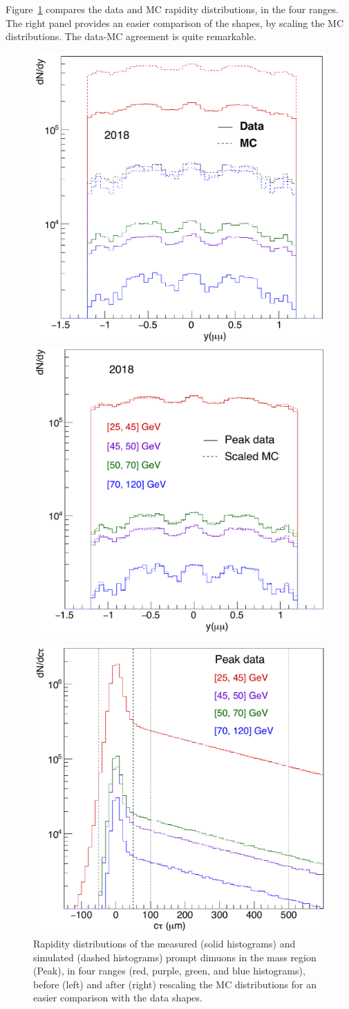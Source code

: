 \vfill\newpage

Figure~\ref{fig:Jpsi_y} compares the data and MC rapidity distributions,
in the four \pt ranges. The right panel provides an easier comparison of the shapes,
by scaling the MC distributions. The data-MC agreement is quite remarkable.

\begin{figure}[t!]
\centering
\includegraphics[width=0.47\linewidth]{Figures/chapter2/y_all2.pdf}
\includegraphics[width=0.47\linewidth]{Figures/chapter2/y_scale2.pdf}
\caption{Rapidity distributions of the measured (solid histograms) 
and simulated (dashed histograms) prompt dimuons in the \jpsi mass region (Peak), 
in four \pt ranges (red, purple, green, and blue histograms), 
before (left) and after (right) rescaling the MC distributions 
for an easier comparison with the data shapes.}
\label{fig:Jpsi_y}
\centering
\includegraphics[width=0.47\linewidth]{Figures/chapter2/lt_all2.pdf}

\end{figure}

